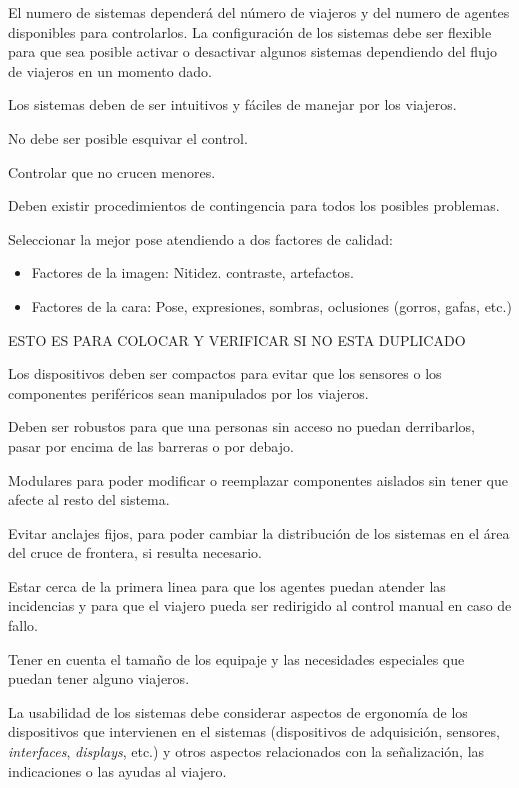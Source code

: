El numero de sistemas dependerá del número de viajeros y del numero de agentes disponibles para controlarlos. La configuración de los sistemas debe ser flexible para que sea posible activar o desactivar algunos sistemas dependiendo del flujo de viajeros en un momento dado.

Los sistemas  deben de ser intuitivos y fáciles de manejar por los viajeros.

No debe ser posible esquivar el control.

Controlar que no crucen menores.

Deben existir procedimientos de contingencia para todos los posibles problemas.

Seleccionar la mejor pose atendiendo a dos factores de calidad:
\begin{itemize}
     \item
     Factores de la imagen: Nitidez. contraste, artefactos.
     \item
     Factores de la cara: Pose, expresiones, sombras, oclusiones (gorros, gafas, etc.)
\end{itemize}

\color{black}

\color{red}ESTO ES PARA COLOCAR Y VERIFICAR SI NO ESTA DUPLICADO

Los dispositivos deben ser compactos para evitar que los sensores o los componentes periféricos sean manipulados por los viajeros.

Deben ser robustos para que una personas sin acceso no puedan derribarlos, pasar por encima de las barreras o por debajo.

Modulares para poder modificar o reemplazar componentes aislados sin tener que afecte al resto del sistema.

Evitar anclajes fijos, para poder cambiar la distribución de los sistemas en el área del cruce de frontera, si resulta necesario. 

Estar cerca de la primera linea para que los agentes puedan atender las incidencias y para que el viajero pueda ser redirigido al control manual en caso de fallo.

Tener en cuenta el tamaño de los equipaje y las necesidades especiales que puedan tener alguno viajeros.
\color{black}


La usabilidad de los sistemas  debe considerar aspectos de ergonomía de los dispositivos que intervienen en el sistemas (dispositivos de adquisición, sensores, \textit{interfaces}, \textit{displays}, etc.) y otros aspectos relacionados con la señalización, las indicaciones o las ayudas al viajero. 

